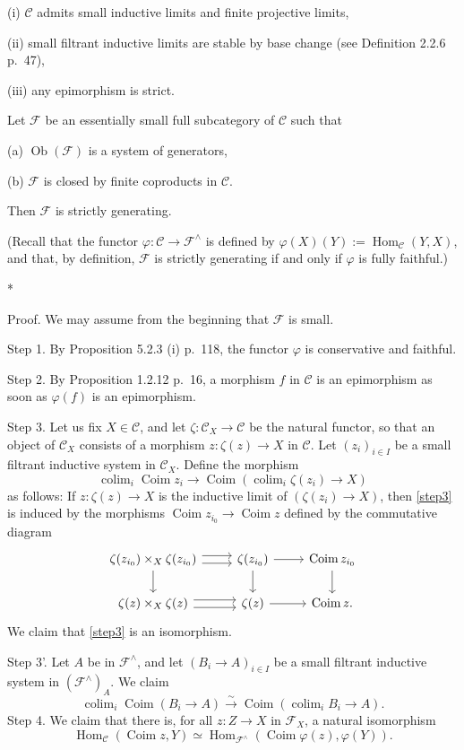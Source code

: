 \documentclass[12pt]{article}
\theoremstyle{remark}
\theoremstyle{definition}
\newcommand{\C}{\mathcal C}
\newcommand{\F}{\mathcal F}
\DeclareMathOperator*{\coli}{colim}
\DeclareMathOperator{\Coim}{Coim}
\DeclareMathOperator{\Hom}{Hom}%
\DeclareMathOperator{\Ob}{Ob}
\begin{document}
\noindent (i) $\C$ admits small inductive limits and finite projective limits, 

\noindent (ii) small filtrant inductive limits are stable by base change (see Definition 2.2.6 p.~47), 

\noindent (iii) any epimorphism is strict.

\noindent Let $\F$ be an essentially small full subcategory of $\C$ such that 

\noindent (a) $\Ob(\F)$ is a system of generators,

\noindent (b) $\F$ is closed by finite coproducts in $\C$. 

\noindent Then $\F$ is strictly generating.

(Recall that the functor $\varphi:\C\to\F^\wedge$ is defined by $\varphi(X)(Y):=\Hom_\C(Y,X)$, and that, by definition, $\F$ is strictly generating if and only if $\varphi$ is fully faithful.)
%
\begin{center}*\end{center}
%
Proof. We may assume from the beginning that $\F$ is small.

\noindent Step 1. By Proposition 5.2.3 (i) p.~118, the functor $\varphi$ is conservative and faithful.

\noindent Step 2. By Proposition 1.2.12 p.~16, a morphism $f$ in $\C$ is an epimorphism as soon as $\varphi(f)$ is an epimorphism.

\noindent Step 3. Let us fix $X\in\C$, and let $\zeta:\C_X\to\C$ be the natural functor, so that an object of $\C_X$ consists of a morphism $z:\zeta(z)\to X$ in $\C$. Let $(z_i)_{i\in I}$ be a small filtrant inductive system in $\C_X$. Define the morphism
% 
\begin{equation}\label{step3}
\coli_i\Coim z_i\to\Coim\left(\coli_i\zeta(z_i)\to X\right)
\end{equation}
%
as follows: If $z:\zeta(z)\to X$ is the inductive limit of $(\zeta(z_i)\to X)$, then \eqref{step3} is induced by the morphisms $\Coim z_{i_0}\to\Coim z$ defined by the commutative diagram 
$$
\begin{tikzcd}
\zeta(z_{i_0})\times_X\zeta(z_{i_0})\ar{d}\ar[yshift=0.7ex]{r}\ar[yshift=-0.7ex]{r}&\zeta(z_{i_0})\ar{d}\ar{r}&\Coim z_{i_0}\ar{d}\\ 
\zeta(z)\times_X\zeta(z)\ar[yshift=0.7ex]{r}\ar[yshift=-0.7ex]{r}&\zeta(z)\ar{r}&\Coim z.
\end{tikzcd}
$$ 
We claim that \eqref{step3} is an isomorphism.

\noindent Step 3'. Let $A$ be in $\F^\wedge$, and let $(B_i\to A)_{i\in I}$ be a small filtrant inductive system in $(\F^\wedge)_A$. We claim 
$$
\coli_i\Coim(B_i\to A)\xrightarrow{\sim}
\Coim\left(\coli_iB_i\to A\right).
$$
Step 4. We claim that there is, for all $z:Z\to X$ in $\F_X$, a natural isomorphism 
$$
\Hom_\C(\Coim z,Y)\simeq\Hom_{\F^\wedge}(\Coim\varphi(z),\varphi(Y)).
$$ 
\end{document}
